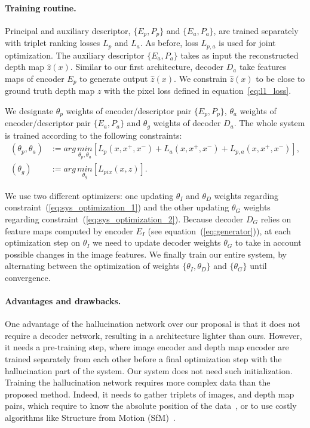 \paragraph{Training routine.}
\label{subsec:training}
Principal and auxiliary descriptor, $\{E_p, P_p\}$ and $\{E_a, P_a\}$, are trained separately with triplet ranking losses $L_p$ and $L_a$. As before, loss $L_{p, a}$ is used for joint optimization. The auxiliary descriptor $\{E_a, P_a\}$ takes as input the reconstructed depth map $\hat{z}(x)$. Similar to our first architecture, decoder $D_a$ take features maps of encoder $E_p$ to generate output $\hat{z}(x)$. We constrain $\hat{z}(x)$ to be close to ground truth depth map $z$ with the pixel loss defined in equation~\ref{eq:l1_loss}. 

We designate $\theta_p$ weights of encoder/descriptor pair $\{E_p, P_p\}$,  $\theta_a$ weights of encoder/descriptor pair $\{E_a, P_a\}$ and $\theta_g$ weights of decoder $D_a$. The whole system is trained according to the following constraints:
\begin{align}
	\left( \theta_{p}, \theta_{a} \right) & := arg\,\underset{\theta_p, \theta_a}{min} \left[ L_p(x, x^+, x^-) + L_a(x, x^+, x^-) + L_{p,a}(x, x^+, x^-) \right], \label{eq:sys_optimization_1} \\ 	
	\left( \theta_{g} \right) & := arg\,\underset{\theta_{g}}{min} \left[ L_{pix}(x, z) \right]. 	\label{eq:sys_optimization_2}
\end{align}

We use two different optimizers: one updating $\theta_{I}$ and $\theta_{D}$ weights regarding constraint~(\ref{eq:sys_optimization_1}) and the other updating $\theta_{G}$ weights regarding constraint~(\ref{eq:sys_optimization_2}). Because decoder $D_G$ relies on feature maps computed by encoder $E_I$ (see equation~(\ref{eq:generator})), at each optimization step on $\theta_{I}$ we need to update decoder weights $\theta_{G}$ to take in account possible changes in the image features. We finally train our entire system, by alternating between the optimization of weights $\{\theta_{I}, \theta_{D}\}$ and $\{\theta_G\}$ until convergence.

\paragraph{Advantages and drawbacks.}
\label{paragraph:adv}
One advantage of the hallucination network over our proposal is that it does not require a decoder network, resulting in a architecture lighter than ours. However, it needs a pre-training step, where image encoder and depth map encoder are trained separately from each other before a final optimization step with the hallucination part of the system. Our system does not need such initialization. Training the hallucination network requires more complex data than the proposed method. Indeed, it needs to gather triplets of images, and depth map pairs, which require to know the absolute position of the data~\citep{Arandjelovic2017,Liu2018}, or to use costly algorithms like Structure from Motion (SfM)~\citep{Godard2017,Radenovic2017,Kim2017a}. 

